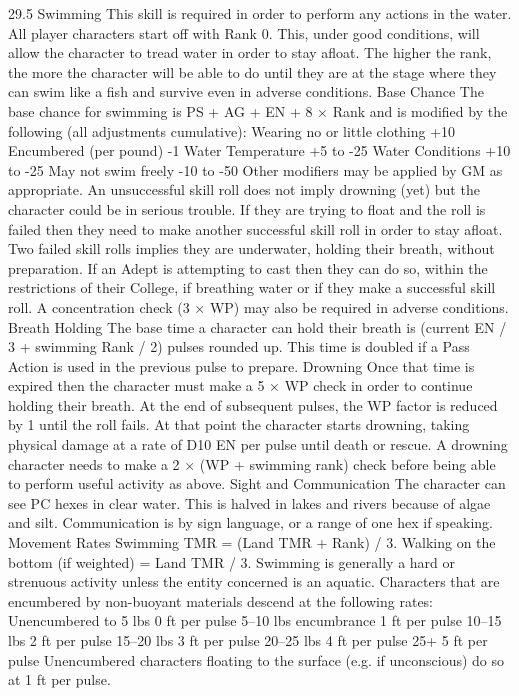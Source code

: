 \documentclass[a4paper]{article}
\begin{document}
\begin{multicols}{3}
29.5 Swimming
This skill is required in order to perform any actions in the water. All player characters start off
with Rank 0. This, under good conditions, will
allow the character to tread water in order to stay
afloat. The higher the rank, the more the character
will be able to do until they are at the stage where
they can swim like a fish and survive even in adverse conditions.
Base Chance
The base chance for swimming is PS + AG + EN +
8 × Rank and is modified by the following (all
adjustments cumulative):
Wearing no or little clothing +10
Encumbered (per pound)
-1
Water Temperature
+5 to -25
Water Conditions
+10 to -25
May not swim freely
-10 to -50
Other modifiers may be applied by GM as appropriate. An unsuccessful skill roll does not imply
drowning (yet) but the character could be in serious
trouble. If they are trying to float and the roll is
failed then they need to make another successful
skill roll in order to stay afloat. Two failed skill
rolls implies they are underwater, holding their
breath, without preparation.
If an Adept is attempting to cast then they can do
so, within the restrictions of their College, if
breathing water or if they make a successful skill
roll. A concentration check (3 × WP) may also be
required in adverse conditions.
Breath Holding
The base time a character can hold their breath is
(current EN / 3 + swimming Rank / 2) pulses
rounded up. This time is doubled if a Pass Action
is used in the previous pulse to prepare.
Drowning
Once that time is expired then the character must
make a 5 × WP check in order to continue holding
their breath. At the end of subsequent pulses, the
WP factor is reduced by 1 until the roll fails.
At that point the character starts drowning, taking
physical damage at a rate of D10 EN per pulse
until death or rescue. A drowning character needs
to make a 2 × (WP + swimming rank) check before
being able to perform useful activity as above.
Sight and Communication
The character can see PC hexes in clear water. This
is halved in lakes and rivers because of algae and
silt.
Communication is by sign language, or a range of
one hex if speaking.
Movement Rates
Swimming TMR = (Land TMR + Rank) / 3. Walking on the bottom (if weighted) = Land TMR / 3.
Swimming is generally a hard or strenuous activity
unless the entity concerned is an aquatic.
Characters that are encumbered by non-buoyant
materials descend at the following rates:
Unencumbered to 5 lbs 0 ft per pulse
5–10 lbs encumbrance
1 ft per pulse
10–15 lbs
2 ft per pulse
15–20 lbs
3 ft per pulse
20–25 lbs
4 ft per pulse
25+
5 ft per pulse
Unencumbered characters floating to the surface
(e.g. if unconscious) do so at 1 ft per pulse.


\end{multicols}
\end{document}
